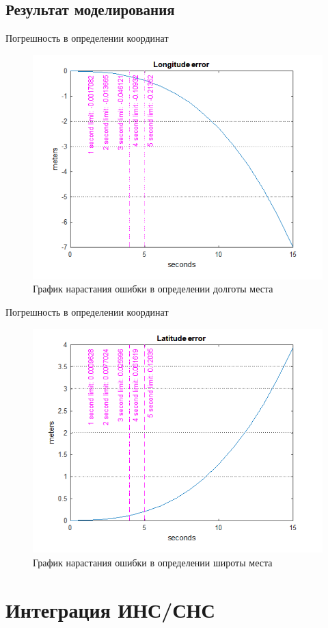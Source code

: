 \documentclass[aspectratio=43,display]{beamer}
\begin{document}
\subsection{Результат моделирования}
\begin{frame}{Погрешность в определении координат}
	\begin{figure}
		\includegraphics[width=0.7\linewidth]{longitudeError.png}
		\caption{График нарастания ошибки в определении долготы места}
		\label{fig:long_error}
	\end{figure}
\end{frame}


\begin{frame}{Погрешность в определении координат}
	\begin{figure}
		\includegraphics[width=0.7\linewidth]{latitudeError.png}
		\caption{График нарастания ошибки в определении широты места}
		\label{fig:lat_error}
	\end{figure}
\end{frame}


\section{Интеграция ИНС/СНС}
\end{document}
